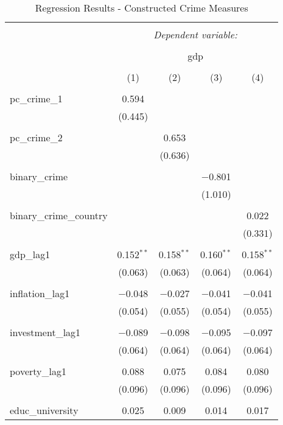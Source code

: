 
\begin{table}[!htbp] \centering 
  \caption{Regression Results - Constructed Crime Measures} 
  \label{} 
\begin{tabular}{@{\extracolsep{5pt}}lcccc} 
\\[-1.8ex]\hline 
\hline \\[-1.8ex] 
 & \multicolumn{4}{c}{\textit{Dependent variable:}} \\ 
\cline{2-5} 
\\[-1.8ex] & \multicolumn{4}{c}{gdp} \\ 
\\[-1.8ex] & (1) & (2) & (3) & (4)\\ 
\hline \\[-1.8ex] 
 pc\_crime\_1 & 0.594 &  &  &  \\ 
  & (0.445) &  &  &  \\ 
  & & & & \\ 
 pc\_crime\_2 &  & 0.653 &  &  \\ 
  &  & (0.636) &  &  \\ 
  & & & & \\ 
 binary\_crime &  &  & $-$0.801 &  \\ 
  &  &  & (1.010) &  \\ 
  & & & & \\ 
 binary\_crime\_country &  &  &  & 0.022 \\ 
  &  &  &  & (0.331) \\ 
  & & & & \\ 
 gdp\_lag1 & 0.152$^{**}$ & 0.158$^{**}$ & 0.160$^{**}$ & 0.158$^{**}$ \\ 
  & (0.063) & (0.063) & (0.064) & (0.064) \\ 
  & & & & \\ 
 inflation\_lag1 & $-$0.048 & $-$0.027 & $-$0.041 & $-$0.041 \\ 
  & (0.054) & (0.055) & (0.054) & (0.055) \\ 
  & & & & \\ 
 investment\_lag1 & $-$0.089 & $-$0.098 & $-$0.095 & $-$0.097 \\ 
  & (0.064) & (0.064) & (0.064) & (0.064) \\ 
  & & & & \\ 
 poverty\_lag1 & 0.088 & 0.075 & 0.084 & 0.080 \\ 
  & (0.096) & (0.096) & (0.096) & (0.096) \\ 
  & & & & \\ 
 educ\_university & 0.025 & 0.009 & 0.014 & 0.017 \\ 

\end{tabular}
\end{table}
